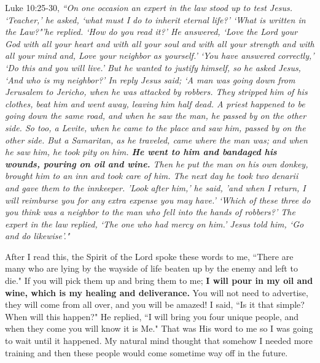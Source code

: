\documentclass[oneside,12pt]{book}
\begin{document}
Luke 10:25-30, \textit{``On one occasion an expert in the law stood up to test Jesus. `Teacher,' he asked, `what must I do to inherit eternal life?' `What is written in the Law?"'he replied. `How do you read it?' He answered, `Love the Lord your God with all your heart and with all your soul and with all your strength and with all your mind and, Love your neighbor as yourself.' `You have answered correctly,' `Do this and you will live.' But he wanted to justify himself, so he asked Jesus, `And who is my neighbor?' In reply Jesus said; `A man was going down from Jerusalem to Jericho, when he was attacked by robbers. They stripped him of his clothes, beat him and went away, leaving him half dead. A priest happened to be going down the same road, and when he saw the man, he passed by on the other side. So too, a Levite, when he came to the place and saw him, passed by on the other side. But a Samaritan, as he traveled, came where the man was; and when he saw him, he took pity on him. \textbf{He went to him and bandaged his wounds, pouring on oil and wine.} Then he put the man on his own donkey, brought him to an inn and took care of him. The next day he took two denarii and gave them to the innkeeper. 'Look after him,' he said, 'and when I return, I will reimburse you for any extra expense you may have.' `Which of these three do you think was a neighbor to the man who fell into the hands of robbers?' The expert in the law replied, `The one who had mercy on him.' Jesus told him, `Go and do likewise'."}

After I read this, the Spirit of the Lord spoke these words to me, ``There are many who are lying by the wayside of life beaten up by the enemy and left to die." If you will pick them up and bring them to me; \textbf{I will pour in my oil and wine, which is my healing and deliverance.} You will not need to advertise, they will come from all over, and you will be amazed! I said, ``Is it that simple? When will this happen?" He replied, ``I will bring you four unique people, and when they come you will know it is Me." That was His word to me so I was going to wait until it happened. My natural mind thought that somehow I needed more training and then these people would come sometime way off in the future.
\end{document}
